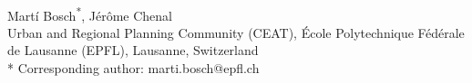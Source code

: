 \documentclass[10pt,letterpaper]{article}
\begin{document}
\vspace*{0.35in}

\begin{flushleft}
{\Large
\textbf{}
}
\newline
\\
Mart\'i Bosch\textsuperscript{*},
J\'er\^ome Chenal
\\
\bigskip
Urban and Regional Planning Community (CEAT), \'Ecole Polytechnique F\'ed\'erale de Lausanne (EPFL), Lausanne, Switzerland
\\
\bigskip
* Corresponding author: marti.bosch@epfl.ch

\end{flushleft}
\end{document}
